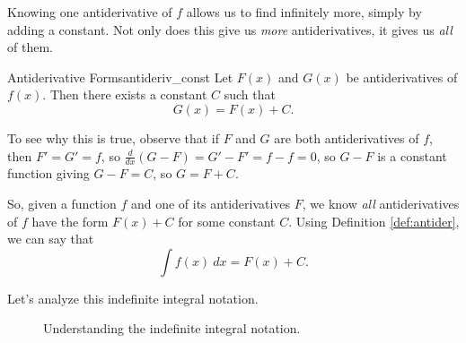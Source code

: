 Knowing one antiderivative of $f$ allows us to find infinitely more, simply by adding a constant. Not only does this give us \textit{more} antiderivatives, it gives us \textit{all} of them.

\begin{theorem}{Antiderivative Forms}{antideriv_const}
{Let $F(x)$ and $G(x)$ be antiderivatives of $f(x)$. Then there exists a constant $C$ such that $$G(x) = F(x) + C.$$
}
\end{theorem}

To see why this is true, observe that if $ F $ and $ G $ are both antiderivatives of $ f $, then $ F'=G'=f $, so $ \frac{d}{dx}(G-F)=G'-F'=f-f=0$, so $ G-F $ is a constant function giving $ G-F=C $, so $ G=F+C$.

So, given a function $f$ and one of its antiderivatives $F$, we know \textit{all} antiderivatives of $f$ have the form $F(x) + C$ for some constant $C$. Using Definition \ref{def:antider}, we can say that $$\int f(x) \ dx = F(x) + C.$$

Let's analyze this indefinite integral notation.


\begin{figure}
\begin{center}

\caption{Understanding the indefinite integral notation.\label{fig:anti1}}
\end{center}
\end{figure}


